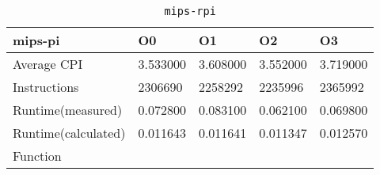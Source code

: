 \begin{table}[ht!]
\centering
\caption{\texttt{mips-rpi}}
\label{tab:mips-rpi}
\begin{tabular}{|l|l|l|l|l|}
\hline
\textbf{mips-pi}	&	\textbf{O0}	&	\textbf{O1}	&	\textbf{O2}	&	\textbf{O3}	\\\hline\hline
Average CPI	&	3.533000	&	3.608000	&	3.552000	&	3.719000	\\\hline
Instructions	&	2306690	&	2258292	&	2235996	&	2365992	\\\hline
Runtime(measured)	&	0.072800	&	0.083100	&	0.062100	&	0.069800	\\\hline
Runtime(calculated)	&	0.011643	&	0.011641	&	0.011347	&	0.012570	\\\hline
Function	&		&		&		&		\\\hline
\end{tabular}
\end{table}
